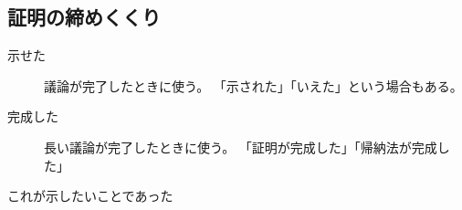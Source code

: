 \documentclass[report]{jlreq}
\begin{document}
\subsection{証明の締めくくり}

\begin{description}
    \item[示せた]
        議論が完了したときに使う。
        「示された」「いえた」という場合もある。
    \item[完成した]
        長い議論が完了したときに使う。
        「証明が完成した」「帰納法が完成した」
    \item[これが示したいことであった]
\end{description}
\end{document}
